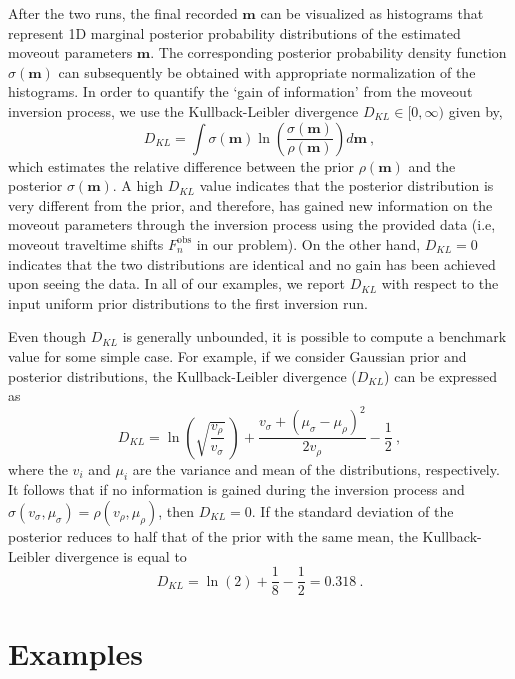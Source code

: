 After the two runs, the final recorded $\mathbf{m}$ can be visualized as histograms that represent 1D marginal posterior probability distributions of the estimated moveout parameters $\mathbf{m}$. The corresponding posterior probability density function $\sigma(\mathbf{m})$ can subsequently be obtained with appropriate normalization of the histograms. In order to quantify the `gain of information' from the moveout inversion process, we use the Kullback-Leibler divergence $D_{KL} \in [0,\infty)$ given by,
\begin{equation}
    D_{KL} = \int \sigma(\mathbf{m})\ln{\left( \frac{\sigma(\mathbf{m})}{\rho(\mathbf{m})}\right)} d\mathbf{m}~,
\end{equation}
which estimates the relative difference between the prior $\rho(\mathbf{m})$ and the posterior $\sigma(\mathbf{m})$. A high $D_{KL}$ value indicates that the posterior distribution is very different from the prior, and therefore, has gained new information on the moveout parameters through the inversion process using the provided data (i.e, moveout traveltime shifts $F^{\text{obs}}_n$ in our problem). On the other hand, $D_{KL}=0$ indicates that the two distributions are identical and no gain has been achieved upon seeing the data. In all of our examples, we report $D_{KL}$ with respect to the input uniform prior distributions to the first inversion run.

Even though $D_{KL}$ is generally unbounded, it is possible to compute a benchmark value for some simple case. For example, if we consider Gaussian prior and posterior distributions, the Kullback-Leibler divergence ($D_{KL}$) can be expressed as
\begin{equation}
    D_{KL} = \ln{\left(\sqrt{\frac{v_\rho}{v_\sigma}}~\right)} + \frac{v_\sigma +(\mu_\sigma-\mu_\rho)^2}{2 v_\rho} -\frac{1}{2}~,
\end{equation}
where the $v_i$ and $\mu_i$ are the variance and mean of the distributions, respectively. It follows that if no information is gained during the inversion process and $\sigma(v_\sigma,\mu_\sigma) = \rho(v_\rho,\mu_\rho)$, then $D_{KL}=0$. If the standard deviation of the posterior reduces to half that of the prior with the same mean, the Kullback-Leibler divergence is equal to
\begin{equation}
    D_{KL} = \ln{(2)} + \frac{1}{8} -\frac{1}{2} = 0.318 ~.
\end{equation}


\section{Examples}

